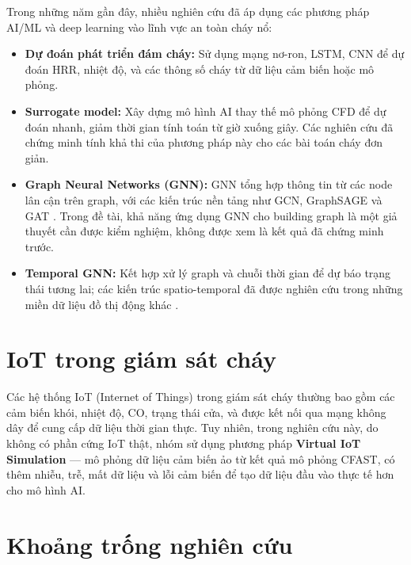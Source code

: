 Trong những năm gần đây, nhiều nghiên cứu đã áp dụng các phương pháp AI/ML và deep learning vào lĩnh vực an toàn cháy nổ:

\begin{itemize}
  \item \textbf{Dự đoán phát triển đám cháy:} Sử dụng mạng nơ-ron, LSTM, CNN để dự đoán HRR, nhiệt độ, và các thông số cháy từ dữ liệu cảm biến hoặc mô phỏng.
  \item \textbf{Surrogate model:} Xây dựng mô hình AI thay thế mô phỏng CFD để dự đoán nhanh, giảm thời gian tính toán từ giờ xuống giây. Các nghiên cứu đã chứng minh tính khả thi của phương pháp này cho các bài toán cháy đơn giản.
  \item \textbf{Graph Neural Networks (GNN):} GNN tổng hợp thông tin từ các node lân cận trên graph, với các kiến trúc nền tảng như GCN, GraphSAGE và GAT \cite{kipf2017gcn,hamilton2017graphsage,velickovic2018gat}. Trong đề tài, khả năng ứng dụng GNN cho building graph là một giả thuyết cần được kiểm nghiệm, không được xem là kết quả đã chứng minh trước.
  \item \textbf{Temporal GNN:} Kết hợp xử lý graph và chuỗi thời gian để dự báo trạng thái tương lai; các kiến trúc spatio-temporal đã được nghiên cứu trong những miền dữ liệu đồ thị động khác \cite{yu2018stgcn}.
\end{itemize}

\section{IoT trong giám sát cháy}
\label{sec:iotfire}

Các hệ thống IoT (Internet of Things) trong giám sát cháy thường bao gồm các cảm biến khói, nhiệt độ, CO, trạng thái cửa, và được kết nối qua mạng không dây để cung cấp dữ liệu thời gian thực. Tuy nhiên, trong nghiên cứu này, do không có phần cứng IoT thật, nhóm sử dụng phương pháp \textbf{Virtual IoT Simulation} — mô phỏng dữ liệu cảm biến ảo từ kết quả mô phỏng CFAST, có thêm nhiễu, trễ, mất dữ liệu và lỗi cảm biến để tạo dữ liệu đầu vào thực tế hơn cho mô hình AI.

\section{Khoảng trống nghiên cứu}
\label{sec:khoangtrong}

